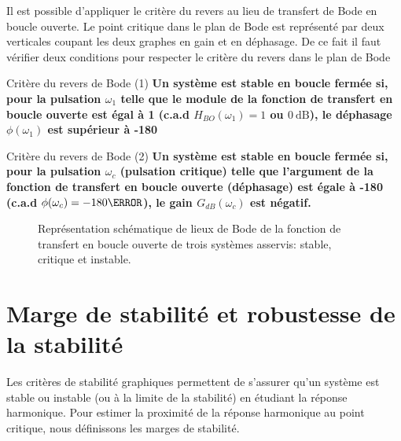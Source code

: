 Il est possible d'appliquer le critère du revers au lieu de transfert de Bode
en boucle ouverte. Le point critique
dans le plan de Bode est représenté par deux verticales coupant les deux 
graphes en gain et en déphasage. De ce fait il faut vérifier deux conditions 
pour respecter le critère du revers dans le plan de Bode 
\begin{criteria}{Critère du revers de Bode (1)}
\textbf{Un système est stable en boucle fermée si, pour la pulsation 
        $\omega_{1}$ telle que le module de la fonction de transfert en boucle 
        ouverte est égal à 1 (c.a.d $H_{BO}(\omega_{1})=1$ ou $\SI{0}{\dB}$), 
        le déphasage $\phi(\omega_1)$ est supérieur à -180\degree}
\end{criteria}

\begin{criteria}{Critère du revers de Bode (2)}
    \textbf{Un système est stable en boucle fermée si, pour la pulsation 
    $\omega_{c}$ (pulsation critique) telle que l'argument de la fonction de 
    transfert en boucle ouverte (déphasage) est égale à -180\degree 
    (c.a.d $\phi(\omega_c)=-180\degree$), le gain $G_{dB}(\omega_c)$ est 
    négatif.}
\end{criteria}

\begin{figure}[!h]
\centering
    
    \caption{Représentation schématique de lieux de Bode de la fonction 
             de transfert en boucle ouverte de trois systèmes asservis: 
             stable, critique et instable.}
\end{figure}

\section{Marge de stabilité et robustesse de la stabilité}
Les critères de stabilité graphiques permettent de s'assurer qu'un système 
est stable ou instable (ou à la limite de la stabilité) en étudiant la réponse
harmonique. Pour estimer la proximité de la réponse harmonique au point 
critique, nous définissons les marges de stabilité. 

